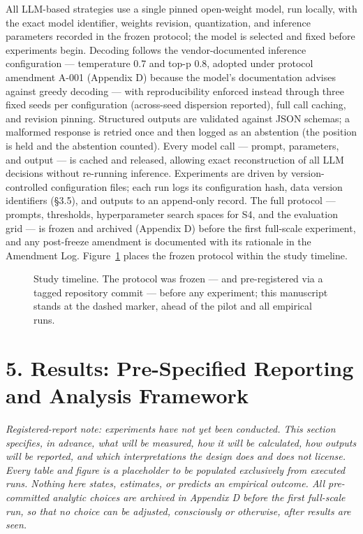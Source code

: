 \documentclass[
  12pt,
]{article}
\begin{document}
All LLM-based strategies use a single pinned open-weight model, run
locally, with the exact model identifier, weights revision,
quantization, and inference parameters recorded in the frozen protocol;
the model is selected and fixed before experiments begin. Decoding
follows the vendor-documented inference configuration --- temperature
0.7 and top-p 0.8, adopted under protocol amendment A-001 (Appendix D)
because the model's documentation advises against greedy decoding ---
with reproducibility enforced instead through three fixed seeds per
configuration (across-seed dispersion reported), full call caching, and
revision pinning. Structured outputs are validated against JSON schemas;
a malformed response is retried once and then logged as an abstention
(the position is held and the abstention counted). Every model call ---
prompt, parameters, and output --- is cached and released, allowing
exact reconstruction of all LLM decisions without re-running inference.
Experiments are driven by version-controlled configuration files; each
run logs its configuration hash, data version identifiers (§3.5), and
outputs to an append-only record. The full protocol --- prompts,
thresholds, hyperparameter search spaces for S4, and the evaluation grid
--- is frozen and archived (Appendix D) before the first full-scale
experiment, and any post-freeze amendment is documented with its
rationale in the Amendment Log. Figure~\ref{fig:timeline} places the frozen protocol within the study timeline.

\begin{figure}[htbp]
\centering
\resizebox{\linewidth}{!}{}
\caption{Study timeline. The protocol was frozen — and pre-registered via a tagged repository commit — before any experiment; this manuscript stands at the dashed marker, ahead of the pilot and all empirical runs.}
\label{fig:timeline}
\end{figure}



\hypertarget{results-pre-specified-reporting-and-analysis-framework}{%
\section{5. Results: Pre-Specified Reporting and Analysis
Framework}\label{results-pre-specified-reporting-and-analysis-framework}}

\emph{Registered-report note: experiments have not yet been conducted.
This section specifies, in advance, what will be measured, how it will
be calculated, how outputs will be reported, and which interpretations
the design does and does not license. Every table and figure is a
placeholder to be populated exclusively from executed runs. Nothing here
states, estimates, or predicts an empirical outcome. All pre-committed
analytic choices are archived in Appendix D before the first full-scale
run, so that no choice can be adjusted, consciously or otherwise, after
results are seen.}
\end{document}
